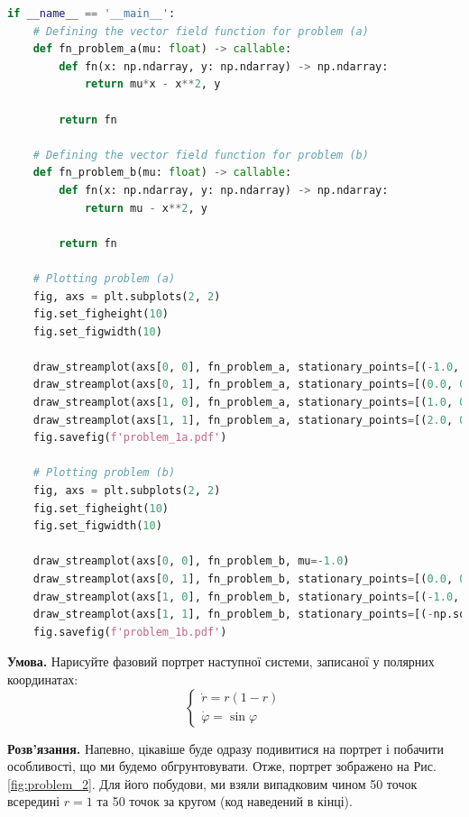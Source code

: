 \documentclass[oneside,solution]{tmpl}
\begin{document}
\begin{lstlisting}[language=Python]
if __name__ == '__main__':
    # Defining the vector field function for problem (a)
    def fn_problem_a(mu: float) -> callable:
        def fn(x: np.ndarray, y: np.ndarray) -> np.ndarray:
            return mu*x - x**2, y
        
        return fn
    
    # Defining the vector field function for problem (b)
    def fn_problem_b(mu: float) -> callable:
        def fn(x: np.ndarray, y: np.ndarray) -> np.ndarray:
            return mu - x**2, y
        
        return fn
    
    # Plotting problem (a)
    fig, axs = plt.subplots(2, 2)
    fig.set_figheight(10)
    fig.set_figwidth(10)
    
    draw_streamplot(axs[0, 0], fn_problem_a, stationary_points=[(-1.0, 0.0), (0.0, 0.0)], mu=-1.0)
    draw_streamplot(axs[0, 1], fn_problem_a, stationary_points=[(0.0, 0.0)], mu=0.0)
    draw_streamplot(axs[1, 0], fn_problem_a, stationary_points=[(1.0, 0.0), (0.0, 0.0)], mu=1.0)
    draw_streamplot(axs[1, 1], fn_problem_a, stationary_points=[(2.0, 0.0), (0.0, 0.0)], mu=2.0)
    fig.savefig(f'problem_1a.pdf')
    
    # Plotting problem (b)
    fig, axs = plt.subplots(2, 2)
    fig.set_figheight(10)
    fig.set_figwidth(10)
    
    draw_streamplot(axs[0, 0], fn_problem_b, mu=-1.0)
    draw_streamplot(axs[0, 1], fn_problem_b, stationary_points=[(0.0, 0.0)], mu=0.0)
    draw_streamplot(axs[1, 0], fn_problem_b, stationary_points=[(-1.0, 0.0), (1.0, 0.0)], mu=1.0)
    draw_streamplot(axs[1, 1], fn_problem_b, stationary_points=[(-np.sqrt(2.0), 0.0), (np.sqrt(2.0), 0.0)], mu=2.0)
    fig.savefig(f'problem_1b.pdf')
\end{lstlisting}

\hspace{20px}\textbf{Умова.} Нарисуйте фазовий портрет наступної системи, записаної у полярних координатах:
\begin{equation}
    \begin{cases}
        \dot{r} = r(1-r) \\
        \dot{\varphi} = \sin \varphi
    \end{cases}
\end{equation}

\textbf{Розв'язання.} Напевно, цікавіше буде одразу подивитися на портрет і побачити особливості, що ми будемо обгрунтовувати. Отже, портрет зображено на Рис. \ref{fig:problem_2}. Для його побудови, ми взяли випадковим чином 50 точок всередині $r=1$ та 50 точок за кругом (код наведений в кінці).
\end{document}
